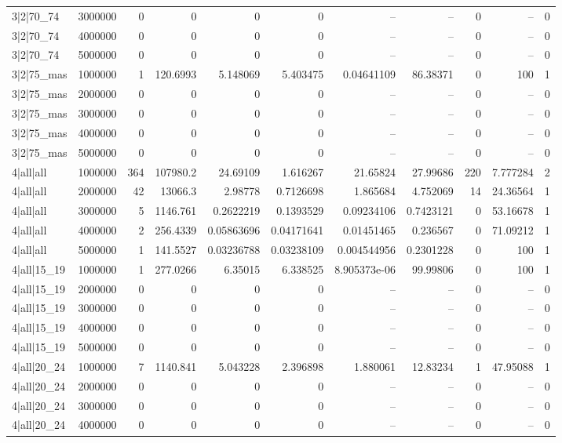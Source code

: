 \begin{tabular}{lrrrrrrrrrr}
3|2|70\_74 & 3000000 & 0 & 0 & 0 & 0 & -- & -- & 0 & -- & 0 \\
3|2|70\_74 & 4000000 & 0 & 0 & 0 & 0 & -- & -- & 0 & -- & 0 \\
3|2|70\_74 & 5000000 & 0 & 0 & 0 & 0 & -- & -- & 0 & -- & 0 \\
3|2|75\_mas & 1000000 & 1 & 120.6993 & 5.148069 & 5.403475 & 0.04641109 & 86.38371 & 0 & 100 & 1 \\
3|2|75\_mas & 2000000 & 0 & 0 & 0 & 0 & -- & -- & 0 & -- & 0 \\
3|2|75\_mas & 3000000 & 0 & 0 & 0 & 0 & -- & -- & 0 & -- & 0 \\
3|2|75\_mas & 4000000 & 0 & 0 & 0 & 0 & -- & -- & 0 & -- & 0 \\
3|2|75\_mas & 5000000 & 0 & 0 & 0 & 0 & -- & -- & 0 & -- & 0 \\
4|all|all & 1000000 & 364 & 107980.2 & 24.69109 & 1.616267 & 21.65824 & 27.99686 & 220 & 7.777284 & 2 \\
4|all|all & 2000000 & 42 & 13066.3 & 2.98778 & 0.7126698 & 1.865684 & 4.752069 & 14 & 24.36564 & 1 \\
4|all|all & 3000000 & 5 & 1146.761 & 0.2622219 & 0.1393529 & 0.09234106 & 0.7423121 & 0 & 53.16678 & 1 \\
4|all|all & 4000000 & 2 & 256.4339 & 0.05863696 & 0.04171641 & 0.01451465 & 0.236567 & 0 & 71.09212 & 1 \\
4|all|all & 5000000 & 1 & 141.5527 & 0.03236788 & 0.03238109 & 0.004544956 & 0.2301228 & 0 & 100 & 1 \\
4|all|15\_19 & 1000000 & 1 & 277.0266 & 6.35015 & 6.338525 & 8.905373e-06 & 99.99806 & 0 & 100 & 1 \\
4|all|15\_19 & 2000000 & 0 & 0 & 0 & 0 & -- & -- & 0 & -- & 0 \\
4|all|15\_19 & 3000000 & 0 & 0 & 0 & 0 & -- & -- & 0 & -- & 0 \\
4|all|15\_19 & 4000000 & 0 & 0 & 0 & 0 & -- & -- & 0 & -- & 0 \\
4|all|15\_19 & 5000000 & 0 & 0 & 0 & 0 & -- & -- & 0 & -- & 0 \\
4|all|20\_24 & 1000000 & 7 & 1140.841 & 5.043228 & 2.396898 & 1.880061 & 12.83234 & 1 & 47.95088 & 1 \\
4|all|20\_24 & 2000000 & 0 & 0 & 0 & 0 & -- & -- & 0 & -- & 0 \\
4|all|20\_24 & 3000000 & 0 & 0 & 0 & 0 & -- & -- & 0 & -- & 0 \\
4|all|20\_24 & 4000000 & 0 & 0 & 0 & 0 & -- & -- & 0 & -- & 0 \\

\end{tabular}
